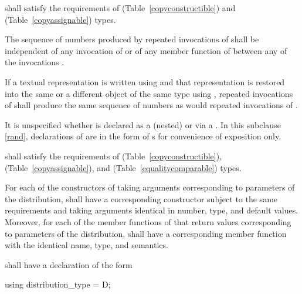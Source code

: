 \pnum
{} shall satisfy the requirements
of  (Table~\ref{copyconstructible})
and  (Table~\ref{copyassignable}) types.

\pnum
The sequence of numbers
produced by repeated invocations of 
shall be independent of any invocation of
or of
any  member function of 
between any of the invocations .

\pnum
If a textual representation is written using 
and that representation is restored
into the same or a different object 
of the same type using ,
repeated invocations of 
shall produce the same sequence of numbers
as would repeated invocations of .

\pnum
It is unspecified whether 
is declared as a (nested) 
or via a .
In this subclause \ref{rand},
declarations of 
are in the form of s
for convenience of exposition only.

\pnum
{} shall satisfy the requirements
of  (Table~\ref{copyconstructible}),
 (Table~\ref{copyassignable}),
and
 (Table~\ref{equalitycomparable}) types.

\pnum
For each of the constructors of 
taking arguments corresponding to parameters of the distribution,
 shall have a corresponding constructor
subject to the same requirements
and taking arguments identical in number, type, and default values.
Moreover,
for each of the member functions of 
that return values corresponding to parameters of the distribution,
 shall have a corresponding member function
with the identical name, type, and semantics.

\pnum
{} shall have a declaration of the form
\begin{codeblock}
using distribution_type =  D;
\end{codeblock}

%
%




